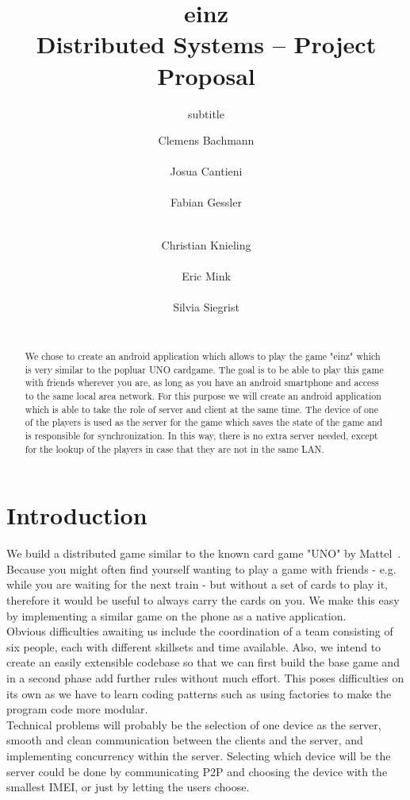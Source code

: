 \documentclass{report}
\title{einz\\
\normalsize{Distributed Systems -- Project Proposal}}
\subtitle{subtitle}
\author{
\alignauthor
\normalsize{Clemens Bachmann}\\
	\affaddr{\normalsize{13-932-488}}\\
	\email{\normalsize{baclemen@student.ethz.ch}}
%
\alignauthor
\normalsize{Josua Cantieni}\\
	\affaddr{\normalsize{15-919-038}}\\
	\email{\normalsize{josuac@student.ethz.ch}}
%
\alignauthor
\normalsize{Fabian Gessler}\\
	\affaddr{\normalsize{15-939-341}}\\
	\email{\normalsize{fgessler@student.ethz.ch}}
\and
\alignauthor
\normalsize{Christian Knieling}\\
	\affaddr{\normalsize{ 14-923-809}}\\
	\email{\normalsize{knielinc@student.ethz.ch}}
%
\alignauthor
\normalsize{Eric Mink}\\
	\affaddr{\normalsize{15-917-057}}\\
	\email{\normalsize{minker@student.ethz.ch}}
%
\alignauthor
\normalsize{Silvia Siegrist}\\
	\affaddr{\normalsize{15-935-893}}\\
	\email{\normalsize{sisilvia@student.ethz.ch}}
}
\begin{document}
\maketitle

\begin{abstract}
We chose to create an android application which allows to play the game "einz" which is very similar to the popluar UNO cardgame. The goal is to be able to play this game with friends wherever you are, as long as you have an android smartphone and access to the same local area network.
For this purpose we will create an android application which is able to take the role of server and client at the same time. The device of one of the players is used as the server for the game which saves the state of the game and is responsible for synchronization. In this way, there is no extra server needed, except for the lookup of the players in case that they are not in the same LAN.
\end{abstract}

\section{Introduction}
We build a distributed game similar to the known card game "UNO" by Mattel~\cite{unoshop}. Because you might often find yourself wanting to play a game with friends - e.g. while you are waiting for the next train - but without a set of cards to play it, therefore it would be useful to always carry the cards on you. We make this easy by implementing a similar game on the phone as a native application.\\

Obvious difficulties awaiting us include the coordination of a team consisting of six people, each with different skillsets and time available.
Also, we intend to create an easily extensible codebase so that we can first build the base game and in a second phase add further rules without much effort. This poses difficulties on its own as we have to learn coding patterns such as using factories to make the program code more modular.\\
Technical problems will probably be the selection of one device as the server, smooth and clean communication between the clients and the server, and implementing concurrency within the server. Selecting which device will be the server could be done by communicating P2P and choosing the device with the smallest IMEI, or just by letting the users choose.\\
\end{document}
